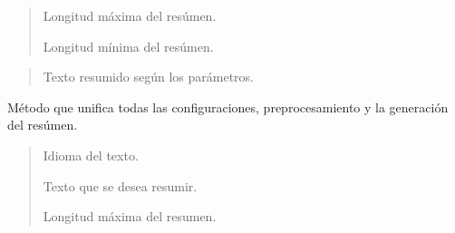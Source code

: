 \documentclass[letterpaper,10pt,english]{sphinxmanual}
\begin{document}
\begin{fulllineitems}
\begin{fulllineitems}
\begin{description}
\begin{quote}
\begin{description}
\sphinxAtStartPar
Longitud máxima del resúmen.

\sphinxAtStartPar
Longitud mínima del resúmen.

\end{description}\end{quote}

\begin{quote}\begin{description}
\sphinxAtStartPar
Texto resumido según los parámetros.

\end{description}\end{quote}

\end{description}

\end{fulllineitems}


\begin{fulllineitems}
\label{\detokenize{Summarizer:Summarizer.ATSM.max_tokens}}
\pysigstartsignatures
{}
\pysigstopsignatures
\end{fulllineitems}


\begin{fulllineitems}
\label{\detokenize{Summarizer:Summarizer.ATSM.summarize}}
\pysigstartsignatures
{}
\pysigstopsignatures
\sphinxAtStartPar
Método que unifica todas las configuraciones, pre\sphinxhyphen{}procesamiento y la generación del resúmen.
\begin{description}
\begin{quote}\begin{description}
\sphinxAtStartPar
Idioma del texto.

\sphinxAtStartPar
Texto que se desea resumir.

\sphinxAtStartPar
Longitud máxima del resumen.


\end{description}
\end{quote}
\end{description}
\end{fulllineitems}
\end{fulllineitems}
\end{document}
